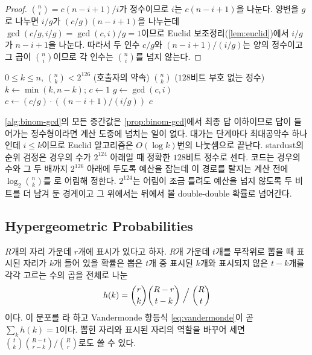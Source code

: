 \begin{proof}
$\binom ni=c(n-i+1)/i$가 정수이므로 $i$는 $c(n-i+1)$을 나눈다. 양변을 $g$로 나누면 $i/g$가 $(c/g)(n-i+1)$을 나누는데 $\gcd(c/g,i/g)=\gcd(c,i)/g=1$이므로 Euclid 보조정리(\cref{lem:euclid})에서 $i/g$가 $n-i+1$을 나눈다. 따라서 두 인수 $c/g$와 $(n-i+1)/(i/g)$는 양의 정수이고 그 곱이 $\binom ni$이므로 각 인수는 $\binom ni$를 넘지 않는다.
\end{proof}

\begin{algorithm}[htbp]
\begin{algorithmic}[1]
\Require $0\le k\le n$, $\binom nk<2^{126}$ (호출자의 약속)
\Ensure $\binom nk$ ($128$비트 부호 없는 정수)
\State $k\gets\min(k,n-k)$; $c\gets1$
  \State $g\gets\gcd(c,i)$ 
  \State $c\gets(c/g)\cdot((n-i+1)/(i/g))$ 
\EndFor
\State \Return $c$
\end{algorithmic}
\caption{넘치지 않는 이항계수 (stardust 의 )}
\label{alg:binom-gcd}
\end{algorithm}

\cref{alg:binom-gcd}의 모든 중간값은 \cref{prop:binom-gcd}에서 최종 답 이하이므로 답이 들어가는 정수형이라면 계산 도중에 넘치는 일이 없다. 대가는 단계마다 최대공약수 하나인데 $i\le k$이므로 Euclid 알고리즘은 $O(\log k)$번의 나눗셈으로 끝난다. stardust의 순위 검정은 경우의 수가 $2^{124}$ 아래일 때 정확한 $128$비트 정수로 센다. 코드는 경우의 수와 그 두 배까지 $2^{126}$ 아래에 두도록 예산을 잡는데 이 경로를 탈지는 계산 전에 $\log_2\binom nk$를 로 어림해 정한다. $2^{124}$는 어림이 조금 틀려도 예산을 넘지 않도록 두 비트를 더 남겨 둔 경계이고 그 위에서는 뒤에서 볼 double-double 확률로 넘어간다.

\subsection{Hypergeometric Probabilities}

$R$개의 자리 가운데 $r$개에 표시가 있다고 하자. $R$개 가운데 $t$개를 무작위로 뽑을 때 표시된 자리가 $k$개 들어 있을 확률은 뽑은 $t$개 중 표시된 $k$개와 표시되지 않은 $t-k$개를 각각 고르는 수의 곱을 전체로 나눈
\begin{equation}
\label{eq:hypergeom}
h(k)=\binom rk\binom{R-r}{t-k}\Bigm/\binom Rt
\end{equation}
이다. 이 분포를 라 하고 Vandermonde 항등식 \cref{eq:vandermonde}이 곧 $\sum_kh(k)=1$이다. 뽑힌 자리와 표시된 자리의 역할을 바꾸어 세면 $\binom tk\binom{R-t}{r-k}/\binom Rr$로도 쓸 수 있다.

